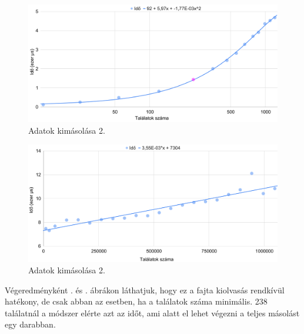 \begin{figure}[h!]
\centering
\includegraphics[width=14.8cm]{images/graph/outpuffer2_1.png}
\caption{Adatok kimásolása 2.}
\label{fig:outpuffer2_1}
\end{figure}

\begin{figure}[h!]
\centering
\includegraphics[width=14.8cm]{images/graph/outpuffer2_2.png}
\caption{Adatok kimásolása 2.}
\label{fig:outpuffer2_2}
\end{figure}

Végeredményként . és . ábrákon láthatjuk, hogy ez a fajta kiolvasás rendkívül hatékony, de csak abban az esetben, ha a találatok száma minimális.
238 találatnál a módszer elérte azt az időt, ami alatt el lehet végezni a teljes másolást egy darabban.



